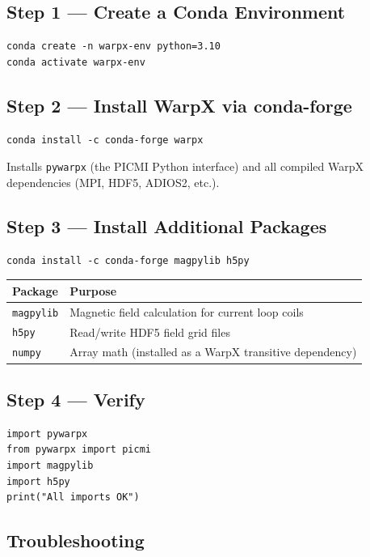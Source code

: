 \documentclass[11pt, a4paper]{article}
\begin{document}
\subsection{Step 1 — Create a Conda Environment}
\begin{lstlisting}[style=bash]
conda create -n warpx-env python=3.10
conda activate warpx-env
\end{lstlisting}

\subsection{Step 2 — Install WarpX via conda-forge}
\begin{lstlisting}[style=bash]
conda install -c conda-forge warpx
\end{lstlisting}
Installs \texttt{pywarpx} (the PICMI Python interface) and all compiled WarpX
dependencies (MPI, HDF5, ADIOS2, etc.).

\subsection{Step 3 — Install Additional Packages}
\begin{lstlisting}[style=bash]
conda install -c conda-forge magpylib h5py
\end{lstlisting}

\begin{longtable}{L{3cm} L{10cm}}
\toprule
\textbf{Package} & \textbf{Purpose} \\
\midrule
\texttt{magpylib} & Magnetic field calculation for current loop coils \\
\texttt{h5py}     & Read/write HDF5 field grid files \\
\texttt{numpy}    & Array math (installed as a WarpX transitive dependency) \\
\bottomrule
\end{longtable}

\subsection{Step 4 — Verify}
\begin{lstlisting}[style=python]
import pywarpx
from pywarpx import picmi
import magpylib
import h5py
print("All imports OK")
\end{lstlisting}

\subsection{Troubleshooting}
\end{document}

